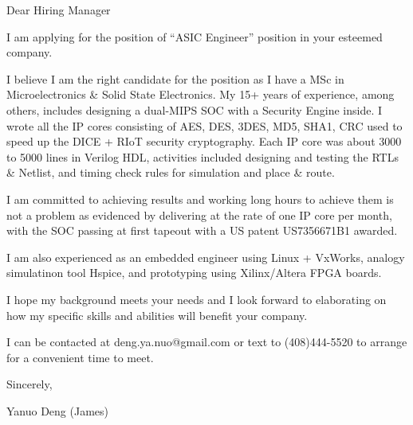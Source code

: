 { 
Dear Hiring Manager
}

{ \bigbreak } 
I am applying for the position of ``ASIC Engineer'' position in your esteemed company.

{ \bigbreak } 
I believe I am the right candidate for the position as I have a MSc in Microelectronics \& Solid State Electronics.
My 15+ years of experience, among others, 
includes designing a dual-MIPS SOC with a Security Engine inside. 
I wrote all the IP cores consisting of AES, DES, 3DES, MD5, SHA1, CRC 
used to speed up the DICE + RIoT security cryptography.
Each IP core was about 3000 to 5000 lines in Verilog HDL, 
activities included designing and testing the RTLs \& Netlist,
and timing check rules for simulation and place \& route.

{ \bigbreak } 
I am committed to achieving results and working long hours 
to achieve them is not a problem as evidenced by 
delivering at the rate of one IP core per month,
with the SOC passing at first tapeout
with a US patent US7356671B1 awarded.

{ \bigbreak } 
I am also experienced as an embedded engineer using Linux + VxWorks, 
analogy simulatinon tool Hspice, 
and prototyping using Xilinx/Altera FPGA boards.

{ \bigbreak } 
I hope my background meets your needs and I look
forward to elaborating on how my specific skills and abilities will benefit your company.

{ \bigbreak } 
I can be contacted at deng.ya.nuo@gmail.com
or text to (408)444-5520 to arrange for a convenient time to meet.

{ \bigbreak } 




\vskip 60pt

{ \bigbreak } 
Sincerely,

Yanuo Deng (James)

\bye
